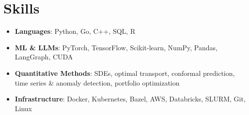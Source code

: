\section{Skills}
\begin{itemize}[leftmargin=*]
    \item \textbf{Languages}: Python, Go, C++, SQL, R
    \item \textbf{ML \& LLMs}: PyTorch, TensorFlow, Scikit-learn, NumPy, Pandas, LangGraph, CUDA
    \item \textbf{Quantitative Methods}: SDEs, optimal transport, conformal prediction, time series \& anomaly detection, portfolio optimization
    \item \textbf{Infrastructure}: Docker, Kubernetes, Bazel, AWS, Databricks, SLURM, Git, Linux
\end{itemize}
